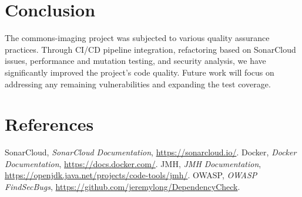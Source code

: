 \documentclass[a4paper,12pt]{report}
\begin{document}
\newpage

\chapter{Conclusion}
The commons-imaging project was subjected to various quality assurance practices. Through CI/CD pipeline integration, refactoring based on SonarCloud issues, performance and mutation testing, and security analysis, we have significantly improved the project’s code quality. Future work will focus on addressing any remaining vulnerabilities and expanding the test coverage.

\newpage

\chapter{References}
\begin{thebibliography}{99}
     SonarCloud, \textit{SonarCloud Documentation}, \url{https://sonarcloud.io/}.
     Docker, \textit{Docker Documentation}, \url{https://docs.docker.com/}.
     JMH, \textit{JMH Documentation}, \url{https://openjdk.java.net/projects/code-tools/jmh/}.
     OWASP, \textit{OWASP FindSecBugs}, \url{https://github.com/jeremylong/DependencyCheck}.
\end{thebibliography}
\end{document}
